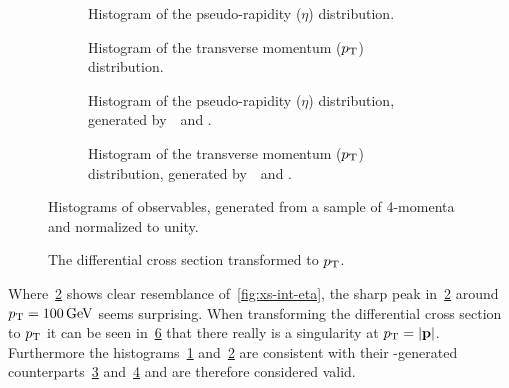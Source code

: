 \begin{figure}[p]
  \centering
  \begin{subfigure}[b]{.49\textwidth}
    \centering {}
    \caption{\label{fig:histeta} Histogram of the pseudo-rapidity
      (\(\eta\)) distribution.}
  \end{subfigure}
  \begin{subfigure}[b]{.49\textwidth}
    \centering {}
    \caption{\label{fig:histpt} Histogram of the transverse momentum
      (\(p_\mathrm{T}\)) distribution.}
  \end{subfigure}
  \begin{subfigure}[b]{.49\textwidth}
    \centering {}
    \caption{\label{fig:histeta_v} Histogram of the pseudo-rapidity
      (\(\eta\)) distribution, generated by~\sherpa\ and \rivet.}
  \end{subfigure}
  \begin{subfigure}[b]{.49\textwidth}
    \centering {}
    \caption{\label{fig:histpt_v} Histogram of the transverse momentum
      (\(p_\mathrm{T}\)) distribution, generated by~\sherpa\ and \rivet.}
  \end{subfigure}
  \caption{\label{fig:histos} Histograms of observables, generated
    from a sample of 4-momenta and normalized to unity.}
\end{figure}

\begin{figure}[p]
  \centering {}
  \caption{\label{fig:diff-xs-pt} The differential cross section
    transformed to \(p_\mathrm{T}\).}
\end{figure}

Where~\ref{fig:histpt} shows clear resemblance
of~\ref{fig:xs-int-eta}, the sharp peak in~\ref{fig:histpt} around
\(p_\mathrm{T}=\SI{100}{\giga\electronvolt}\) seems surprising. When
transforming the differential cross section to \(p_\mathrm{T}\) it can be seen
in~\ref{fig:diff-xs-pt} that there really is a singularity at
\(p_\mathrm{T} =\abs{\vb{p}}\). Furthermore the histograms~\ref{fig:histeta}
and~\ref{fig:histpt} are consistent with their \rivet-generated
counterparts~\ref{fig:histeta_v} and~\ref{fig:histpt_v} and are
therefore considered valid.
